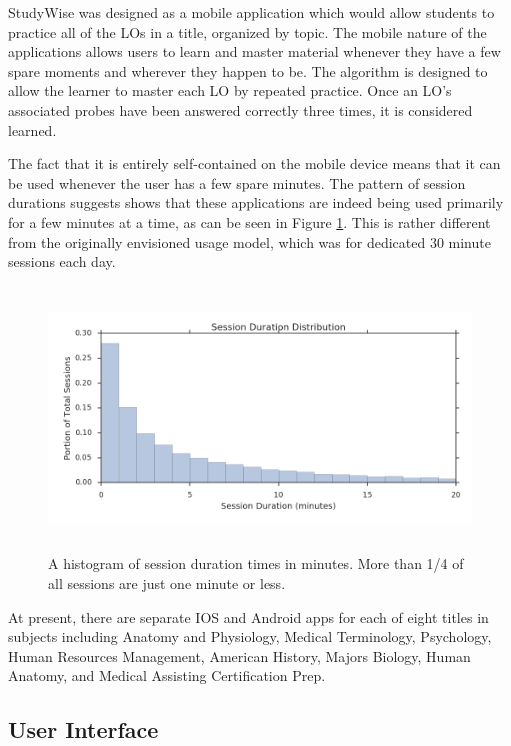 \documentclass[runningheads,a4paper]{llncs}
\begin{document}
StudyWise was designed as a mobile application which would allow students to practice all of the LOs in a title, organized by topic.  The mobile nature of the applications allows users to learn and master material whenever they have a few spare moments and wherever they happen to be.  The algorithm is designed to allow the learner to master each LO by repeated practice.  Once an LO's associated probes have been answered correctly three times, it is considered learned.

The fact that it is entirely self-contained on the mobile device means that it can be used whenever the user has a few spare minutes.  The pattern of session durations suggests shows that these applications are indeed being used primarily for a few minutes at a time, as can be seen in Figure \ref{fig:SessionDurationHistogram}.  This is rather different from the originally envisioned usage model, which was for dedicated 30 minute sessions each day.

\begin{figure}
\centering
\includegraphics[height=2.75in]{SessionDurationHistogram_v1}
\caption{A histogram of session duration times in minutes.  More than 1/4 of all sessions are just one minute or less.}
\label{fig:SessionDurationHistogram}
\end{figure}

At present, there are separate IOS and Android apps for each of eight titles in subjects including Anatomy and Physiology, Medical Terminology, Psychology, Human Resources Management, American History, Majors Biology, Human Anatomy, and Medical Assisting Certification Prep. 

\subsection{User Interface}
    
\end{document}
